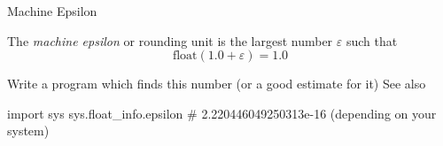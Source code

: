 \begin{frame}[fragile]{Machine Epsilon}
\vfill
\begin{Definition}
The \emph{machine epsilon} or rounding unit
is the largest number $\varepsilon$ such that
\[
\mathrm{float}(1.0+\varepsilon)=1.0
\]
\end{Definition}
\vfill
Write a program which finds this number (or a good estimate for it)
\vfill
See also

\begin{python}
import sys
sys.float_info.epsilon # 2.220446049250313e-16 (depending on your system)
\end{python}

\end{frame}
